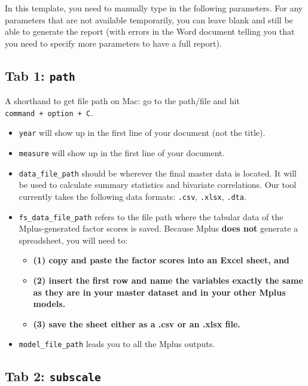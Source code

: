 \documentclass[
]{book}
\begin{document}
In this template, you need to manually type in the following parameters. For any parameters that are not available temporarily, you can leave blank and still be able to generate the report (with errors in the Word document telling you that you need to specify more parameters to have a full report).

\hypertarget{tab-1-path}{%
\subsection{\texorpdfstring{Tab 1: \texttt{path}}{Tab 1: path}}\label{tab-1-path}}

A shorthand to get file path on Mac: go to the path/file and hit \texttt{command\ +\ option\ +\ C}.

\begin{itemize}
\item
  \texttt{year} will show up in the first line of your document (not the title).
\item
  \texttt{measure} will show up in the first line of your document.
\item
  \texttt{data\_file\_path} should be wherever the final master data is located. It will be used to calculate summary statistics and bivariate correlations. Our tool currently takes the following data formats: \texttt{.csv}, \texttt{.xlsx}, \texttt{.dta}.
\item
  \texttt{fs\_data\_file\_path} refers to the file path where the tabular data of the Mplus-generated factor scores is saved. Because Mplus \textbf{does not} generate a spreadsheet, you will need to:

  \begin{itemize}
  \item
    \textbf{(1) copy and paste the factor scores into an Excel sheet, and}
  \item
    \textbf{(2) insert the first row and name the variables exactly the same as they are in your master dataset and in your other Mplus models.}
  \item
    \textbf{(3) save the sheet either as a .csv or an .xlsx file.}
  \end{itemize}
\item
  \texttt{model\_file\_path} leads you to all the Mplus outputs.
\end{itemize}

\hypertarget{tab-2-subscale}{%
\subsection{\texorpdfstring{Tab 2: \texttt{subscale}}{Tab 2: subscale}}\label{tab-2-subscale}}
\end{document}
